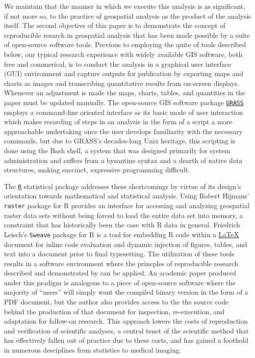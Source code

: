 We maintain that the manner in which we execute this analysis is as
significant, if not more so, to the practice of geospatial analysis as
the product of the analysis itself.  The second objective of this
paper is to demonstrate the concept of reproducible resarch in
geospatial analysis that has been made possible by a suite of
open-source software tools.  Previous to employing the quite of tools
described below, our typical research experience with widely available
GIS software, both free and commerical, is to conduct the analysis in
a graphical user interface (GUI) environment and capture outputs for
publication by exporting maps and charts as images and transcribing
quantitative results from on-screen displays.  Whenever an adjustment
is made the maps, charts, tables, and quantities in the paper must be
updated manually.  The open-source GIS software package
\href{http://grass.osgeo.org/}{\texttt{GRASS}} \citep{GRASS} employs a
command-line oriented interface as its basic mode of user interaction
which makes recording of steps in an analysis in the form of a script
a more approachable undertaking once the user develops familiarity
with the necessary commands, but due to GRASS's decades-long Unix
heritage, this scripting is done using the Bash shell, a system that
was designed primarily for system administration and suffers from a
byzantine syntax and a dearth of native data structures, making
succinct, expressive programming difficult.

The \href{http://www.r-project.org/}{\texttt{R}} statistical package
addresses these shortcomings \citep{R} by virtue of its design's
orientation towards mathematical and statistical analysis.  Using
Robert Hijmans' \citeyearpar{Hijman2011} \texttt{raster} package for R
provides an interface for accessing and analyzing geospatial raster
data sets without being forced to load the entire data set into
memory, a constraint that has historically been the case with R data
in general.  Friedrich Leisch's \citeyearpar{Leisch2002}
\texttt{Sweave} package for R is a tool for embedding R code within a
\href{http://www.latex-project.org/}{\LaTeX} \citep{Lamport1994}
document for inline code evaluation and dynamic injection of figures,
tables, and text into a document prior to final typesetting.  The
utilization of these tools results in a software environment where the
princples of reproducible research described and demonstrated by
\citet{Gentleman2007} can be applied.  An academic paper produced
under this pradigm is analogous to a piece of open-source software
where the majority of ``users'' will simply want the compiled binary
version in the form of a PDF document, but the author also provides
access to the the source code behind the production of that document
for inspection, re-execution, and adaptation for follow-on research.
This approach lowers the costs of reproduction and verification of
scientific analyses, a central tenet of the scientific method that has
effectively fallen out of practice due to these costs, and has gained
a foothold in numerous desciplines from statistics to medical imaging.

